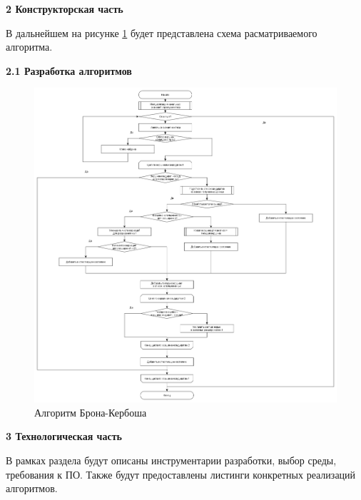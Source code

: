 \documentclass[a4paper,12pt]{report}
\begin{document}
    \newpage

    \begin{center}
        \textbf{2 Конструкторская часть}
    \end{center}
        \label{sec:construct_part}

			В дальнейшем на рисунке \ref{ris:bron_k} будет представлена схема расматриваемого алгоритма.

	\begin{center}
        \textbf{2.1 Разработка алгоритмов}
    \end{center}

		\begin{figure}[h!]
			\includegraphics[width=1\linewidth]{bron_kerbosh.png}
			\caption{Алгоритм Брона-Кербоша}
			\label{ris:bron_k}
		\end{figure}

    \newpage

    \begin{center}
        \textbf{3 Технологическая часть}
    \end{center}
        \label{sec:tecnologic_part}

			В рамках раздела будут описаны инструментарии разработки, выбор среды, требования к ПО. 
			Также будут предоставлены листинги конкретных реализаций алгоритмов.
\end{document}
